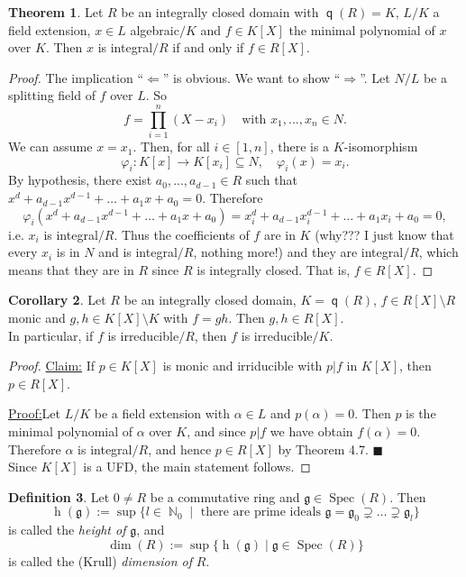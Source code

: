 \documentclass[12pt,a4paper]{report}
\theoremstyle{definition}
\newtheorem{theorem}{Theorem}[chapter] %
\newtheorem{corollary}[theorem]{Corollary} %
\newtheorem{defn}[theorem]{Definition}
\theoremstyle{num.custom-title}
\newenvironment{claim}[1]{\par\noindent\underline{Claim#1:}\space}{} %
\newenvironment{claimproof}[1]{\par\noindent\underline{Proof:}\space#1}{\leavevmode\unskip\penalty9999 \hbox{}\nobreak\hfill\quad\hbox{$\blacksquare$}} %
\DeclareMathOperator{\N}{\mathbb{N}}
\DeclareMathOperator{\imp}{\Rightarrow}
\DeclareMathOperator{\pmi}{\Leftarrow}
\DeclareMathOperator{\sm}{\setminus}
\DeclareMathOperator{\sse}{\subseteq}
\DeclareMathOperator{\Spec}{Spec}
\DeclareMathOperator{\q}{\mathsf{q}}
\DeclareMathOperator{\h}{h}
\newcommand{\g}{\mathfrak{g}}
\renewcommand{\phi}{\varphi}
\begin{document}
\begin{theorem}
Let $R$ be an integrally closed domain with $\q(R)=K$, $L/K$ a field extension, $x \in L$ algebraic$/K$ and $f \in K[X]$ the minimal polynomial of $x$ over $K$. Then $x$ is integral$/R$ if and only if $f \in R[X]$.
\begin{proof}
The implication ``$\pmi$'' is obvious. We want to show ``$\imp$''. Let $N/L$ be a splitting field of $f$ over $L$. So
\[
f = \prod_{i=1}^n (X-x_i) \quad \text{with } x_1,...,x_n \in N.
\]
We can assume $x=x_1$. Then, for all $i \in [1,n]$, there is a $K$-isomorphism
\[
\phi_i : K[x] \to K[x_i] \sse N, \quad \phi_i(x) = x_i.
\]
By hypothesis, there exist $a_0,...,a_{d-1} \in R$ such that $x^d+a_{d-1}x^{d-1} + \ldots + a_1 x + a_0 = 0$. Therefore
\[
\phi_i(x^d+a_{d-1}x^{d-1} + \ldots + a_1 x + a_0) = x_i^d+a_{d-1}x_i^{d-1} + \ldots + a_1 x_i + a_0 = 0,
\]
i.e. $x_i$ is integral$/R$. Thus the coefficients of $f$ are in $K$ (why??? I just know that every $x_i$ is in $N$ and is integral$/R$, nothing more!) and they are integral$/R$, which means that they are in $R$ since $R$ is integrally closed. That is, $f \in R[X]$.
\end{proof}
\end{theorem}

\begin{corollary}
Let $R$ be an integrally closed domain, $K = \q(R)$, $f \in R[X] \sm R$ monic and $g,h \in K[X] \sm K$ with $f=gh$. Then $g,h \in R[X]$.\\
In particular, if $f$ is irreducible$/R$, then $f$ is irreducible$/K$.
\begin{proof}
\begin{claim}{}
If $p \in K[X]$ is monic and irriducible with $p|f$ in $K[X]$, then $p \in R[X]$.
\begin{claimproof}
Let $L/K$ be a field extension with $\alpha \in L$ and $p(\alpha)=0$. Then $p$ is the minimal polynomial of $\alpha$ over $K$, and since $p|f$ we have obtain $f(\alpha)=0$. Therefore $\alpha$ is integral$/R$, and hence $p \in R[X]$ by Theorem 4.7.
\end{claimproof}\\
Since $K[X]$ is a UFD, the main statement follows.
\end{claim}
\end{proof}
\end{corollary}

\begin{defn}
Let $0 \neq R$ be a commutative ring and $\g \in \Spec(R)$. Then
\[
\h(\g) := \sup\{l \in \N_0 \mid \text{ there are prime ideals } \g = \g_0 \supsetneq \ldots \supsetneq \g_l \}
\]
is called the \emph{height of} $\g$, and
\[
\dim(R) := \sup\{ \h(\g) \mid \g \in \Spec(R)\}
\]
is called the (Krull) \emph{dimension of} $R$.
\end{defn}
\end{document}
